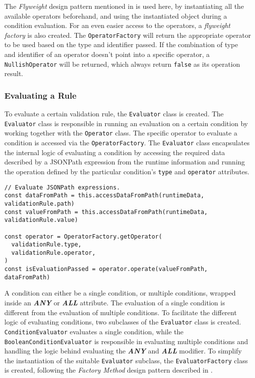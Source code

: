       The \emph{Flyweight} design pattern mentioned in \autocite[pp. 195-206]{gamma-1995} is used here, by instantiating all the available operators beforehand, and using the instantiated object during a condition evaluation. For an even easier access to the operators, a \emph{flyweight factory} is also created. The \verb;OperatorFactory; will return the appropriate operator to be used based on the type and identifier passed. If the combination of type and identifier of an operator doesn't point into a specific operator, a \verb;NullishOperator; will be returned, which always return \verb;false; as its operation result. 

    \subsubsection{Evaluating a Rule} 
      
      To evaluate a certain validation rule, the \verb;Evaluator; class is created. The \verb;Evaluator; class is responsible in running an evaluation on a certain condition by working together with the \verb;Operator; class. The specific operator to evaluate a condition is accessed via the \verb;OperatorFactory;. The \verb;Evaluator; class encapsulates the internal logic of evaluating a condition by accessing the required data described by a JSONPath expression from the runtime information and running the operation defined by the particular condition's \verb;type; and \verb;operator; attributes. 

      \begin{lstlisting}[style=es6, caption={The usage of OperatorFactory class in the Evaluator class (TypeScript)}]
// Evaluate JSONPath expressions.
const dataFromPath = this.accessDataFromPath(runtimeData, validationRule.path)
const valueFromPath = this.accessDataFromPath(runtimeData, validationRule.value)
        
const operator = OperatorFactory.getOperator(
  validationRule.type,
  validationRule.operator,
)
const isEvaluationPassed = operator.operate(valueFromPath, dataFromPath)
\end{lstlisting}
      
      A condition can either be a single condition, or multiple conditions, wrapped inside an \textbf{\emph{ANY}} or \textbf{\emph{ALL}} attribute. The evaluation of a single condition is different from the evaluation of multiple conditions. To facilitate the different logic of evaluating conditions, two subclasses of the \verb;Evaluator; class is created. \verb;ConditionEvaluator; evaluates a single condition, while the \verb;BooleanConditionEvaluator; is responsible in evaluating multiple conditions and handling the logic behind evaluating the \textbf{\emph{ANY}} and \textbf{\emph{ALL}} modifier. To simplify the instantiation of the suitable \verb;Evaluator; subclass, the \verb;EvaluatorFactory; class is created, following the \emph{Factory Method} design pattern described in \autocite[pp. 107-116]{gamma-1995}. 


